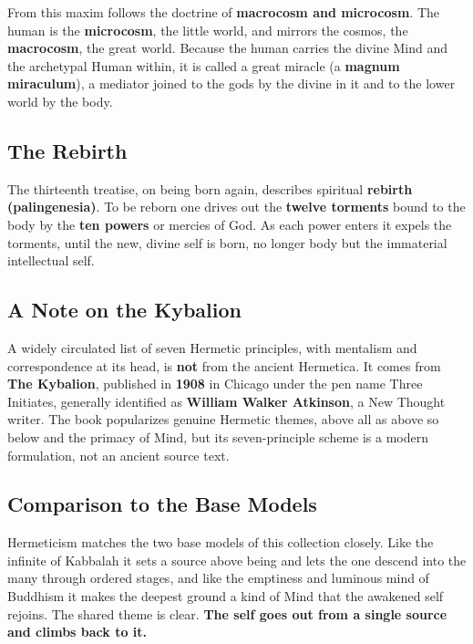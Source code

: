 From this maxim follows the doctrine of \textbf{macrocosm and microcosm}. The human is the \textbf{microcosm}, the little world, and mirrors the cosmos, the \textbf{macrocosm}, the great world. Because the human carries the divine Mind and the archetypal Human within, it is called a great miracle (a \textbf{magnum miraculum}), a mediator joined to the gods by the divine in it and to the lower world by the body.

\subsection{The Rebirth}

The thirteenth treatise, on being born again, describes spiritual \textbf{rebirth (palingenesia)}. To be reborn one drives out the \textbf{twelve torments} bound to the body by the \textbf{ten powers} or mercies of God. As each power enters it expels the torments, until the new, divine self is born, no longer body but the immaterial intellectual self.

\subsection{A Note on the Kybalion}

A widely circulated list of seven Hermetic principles, with mentalism and correspondence at its head, is \textbf{not} from the ancient Hermetica. It comes from \textbf{The Kybalion}, published in \textbf{1908} in Chicago under the pen name Three Initiates, generally identified as \textbf{William Walker Atkinson}, a New Thought writer. The book popularizes genuine Hermetic themes, above all as above so below and the primacy of Mind, but its seven-principle scheme is a modern formulation, not an ancient source text.

\subsection{Comparison to the Base Models}

Hermeticism matches the two base models of this collection closely. Like the infinite of Kabbalah it sets a source above being and lets the one descend into the many through ordered stages, and like the emptiness and luminous mind of Buddhism it makes the deepest ground a kind of Mind that the awakened self rejoins. The shared theme is clear. \textbf{The self goes out from a single source and climbs back to it.}
